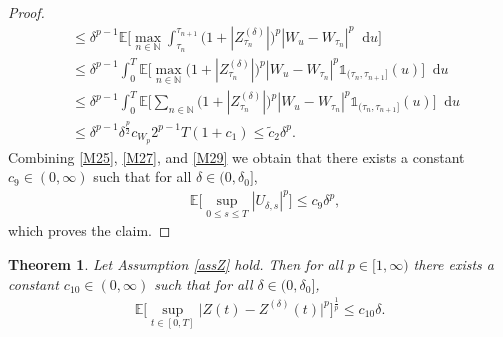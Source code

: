 \documentclass[11pt,a4paper]{article}
\numberwithin{equation}{section}
\newtheorem{theorem}{Theorem}[section]
\theoremstyle{definition}
\newcommand{\E}{{\mathbb{E}}}
\newcommand{\N}{{\mathbb{N}}}
\newcommand{\diff}{\mathop{}\!\mathrm{d}}
\begin{document}
\begin{proof}
\begin{equation}
\begin{aligned}
        & \leq \delta^{p-1} \E\Big[ \max_{n\in\N} \int_{\tau_n}^{\tau_{n+1}} \big( 1 +  |Z^{(\delta)}_{\tau_n}|\big)^p|W_u-W_{\tau_n}|^p \diff u \Big]\\
        & \leq \delta^{p-1} \int_{0}^{T}\E\Big[ \max_{n\in\N}  \big( 1 +  |Z^{(\delta)}_{\tau_n}|\big)^p|W_u-W_{\tau_n}|^p \mathds{1}_{(\tau_n,\tau_{n+1}]} (u)  \Big] \diff u\\
        &\leq \delta^{p-1} \int_{0}^{T}\E\Big[ \sum_{n\in\N}  \big( 1 +  |Z^{(\delta)}_{\tau_n}|\big)^p|W_u-W_{\tau_n}|^p \mathds{1}_{(\tau_n,\tau_{n+1}]} (u)  \Big] \diff u\\
        &\leq \delta^{p-1} \delta^{\frac{p}{2}} c_{W_p} 2^{p-1} T(1+c_1)
        \leq \widetilde c_2 \delta^{p}.
        \end{aligned}
    \end{equation}
    Combining \eqref{M25}, \eqref{M27}, and \eqref{M29} we obtain that there exists a constant $ c_{9}\in(0,\infty)$ such that for all $\delta\in(0,\delta_0]$,
    \begin{equation}\label{M30}
        \begin{aligned}
        &  \E\Big[\sup_{0\leq s\leq T} |U_{\delta,s}|^p\Big]\leq  c_{9} \delta^{p},
        \end{aligned}
    \end{equation}
    which proves the claim.
\end{proof}

\begin{theorem}\label{ConvResTSDE}
Let Assumption \ref{assZ} hold. Then for all $p\in[1,\infty)$ there exists a constant $c_{10}\in(0,\infty)$ such that for all $\delta\in (0,\delta_0]$,
\begin{equation}
    \begin{aligned}
    \E\Big[\sup_{t\in[0,T]}\big| Z(t) - Z^{(\delta)}(t)\big|^p \Big]^{\frac{1}{p}} \leq c_{10} \delta.
    \end{aligned}
\end{equation}
\end{theorem}
\end{document}
